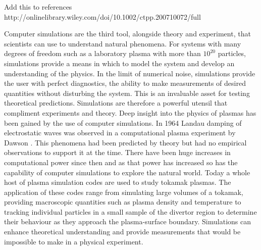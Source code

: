 Add this to references
http://onlinelibrary.wiley.com/doi/10.1002/ctpp.200710072/full


Computer simulations are the third tool, alongside theory and experiment, that scientists can use to understand natural phenomena. For systems with many degrees of freedom such as a laboratory plasma with more than $10^{20}$ particles, simulations provide a means in which to model the system and develop an understanding of the physics. In the limit of numerical noise, simulations provide the user with perfect diagnostics, the ability to make measurements of desired quantities without disturbing the system. This is an invaluable asset for testing theoretical predictions. Simulations are therefore a powerful utensil that compliment experiments and theory. Deep insight into the physics of plasmas has been gained by the use of computer simulations. In 1964 Landau damping of electrostatic waves was observed in a computational plasma experiment by Dawson \cite{Dawson}. This phenomena had been predicted by theory but had no empirical observations to support it at the time. There have been huge increases in computational power since then and as that power has increased so has the capability of computer simulations to explore the natural world. Today a whole host of plasma simulation codes are used to study tokamak plasmas. The application of these codes range from simulating large volumes of a tokamak, providing macroscopic quantities such as plasma density and temperature to tracking individual particles in a small sample of the divertor region to determine their behaviour as they approach the plasma-surface boundary. Simulations can enhance theoretical understanding and provide measurements that would be impossible to make in a physical experiment.    




